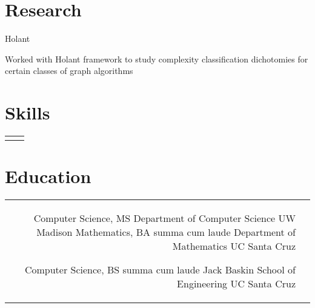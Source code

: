 \documentclass[10pt]{article}
\begin{document}
\begin{paracol}{2}
\vspace{-\baselineskip}\medskip

\switchcolumn

\section{Research}

\workposition{}
{}{}{}
{Holant}{}
{
  \item Worked with Holant framework to study complexity classification dichotomies for certain classes of graph algorithms
}

\section{Skills}
\begin{supertabular}{rl}


\end{supertabular}

\section{Education}

\begin{supertabular}{rl}
	{Computer Science, MS}
	{}
    {Department of Computer Science}
	{UW Madison}
	{Mathematics, BA}
	{summa cum laude}
    {Department of Mathematics}
	{UC Santa Cruz}

    {Computer Science, BS}
    {summa cum laude}
    {Jack Baskin School of Engineering}
    {UC Santa Cruz}

\end{supertabular}

\end{paracol}
\end{document}
